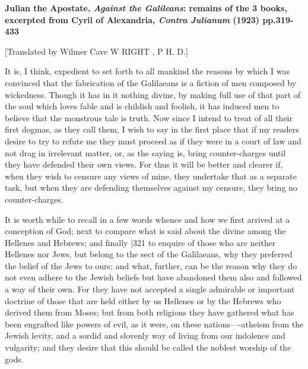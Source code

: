 
\textbf{Julian the Apostate, \emph{Against the Galileans}: remains
of the 3 books, excerpted from Cyril of Alexandria, \emph{Contra Julianum} (1923) pp.319-433}

[Translated by Wilmer Cave W RIGHT ,
P H. D.]


It is, I think, expedient to set forth to all mankind the reasons by which I was convinced that the fabrication of the Galilaeans is a fiction of men composed by wickedness. Though it has in it nothing divine, by making full use of that part of the soul which loves fable and is childish and foolish, it has induced men to believe that the monstrous tale is truth. Now since I intend to treat of all their first dogmas, as they call them, I wish to say in the first place that if my readers desire to try to refute me they must proceed as if they were in a court of law and not drag in irrelevant matter, or, as the saying is, bring counter-charges until they have defended their own views. For thus it will be better and clearer if, when they wish to censure any views of mine, they undertake that as a separate task, but when they are defending themselves against my censure, they bring no counter-charges.

It is worth while to recall in a few words whence and how we first arrived at a conception of God; next to compare what is said about the divine among the Hellenes and Hebrews; and finally
|321 to enquire of those who are neither Hellenes nor Jews, but belong to the sect of the Galilaeans, why they preferred the belief of the Jews to ours; and what, further, can be the reason why they do not even adhere to the Jewish beliefs but have abandoned them also and followed a way of their own. For they have not accepted a single admirable or important doctrine of those that are held either by us Hellenes or by the Hebrews who derived them from Moses; but from both religions they have gathered what has been engrafted like powers of evil, as it were, on these nations----atheism from the Jewish levity, and a sordid and slovenly way of living from our indolence and vulgarity; and they desire that this should be called the noblest worship of the gods.

